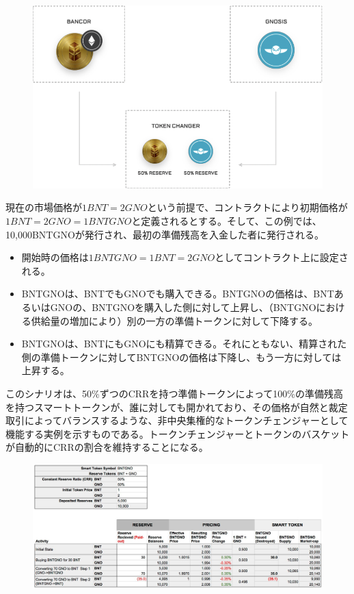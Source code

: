 \documentclass{jsarticle}
\begin{document}
  \begin{figure}
    \begin{center}
     \includegraphics[keepaspectratio,scale=0.8]{fig3.png}
    \end{center}
   \end{figure} 
  \noindent

  現在の市場価格が$1 BNT = 2 GNO$という前提で、コントラクトにより初期価格が$1 BNT = 2 GNO = 1 BNTGNO$と定義されるとする。そして、この例では、10,000BNTGNOが発行され、最初の準備残高を入金した者に発行される。

  \begin{itemize}
    \item 開始時の価格は$1 BNTGNO = 1 BNT = 2 GNO$としてコントラクト上に設定される。
    \item BNTGNOは、BNTでもGNOでも購入できる。BNTGNOの価格は、BNTあるいはGNOの、BNTGNOを購入した側に対して上昇し、（BNTGNOにおける供給量の増加により）別の一方の準備トークンに対して下降する。
    \item BNTGNOは、BNTにもGNOにも精算できる。それにともない、精算された側の準備トークンに対してBNTGNOの価格は下降し、もう一方に対しては上昇する。
  \end{itemize}

  このシナリオは、50\%ずつのCRRを持つ準備トークンによって100\%の準備残高を持つスマートトークンが、誰に対しても開かれており、その価格が自然と裁定取引によってバランスするような、非中央集権的なトークンチェンジャーとして機能する実例を示すものである。トークンチェンジャーとトークンのバスケットが自動的にCRRの割合を維持することになる。

  \begin{figure}[h]
   \begin{center}
    \includegraphics[scale=0.3]{fig4.png}
   \end{center}
  \end{figure}
\end{document}
